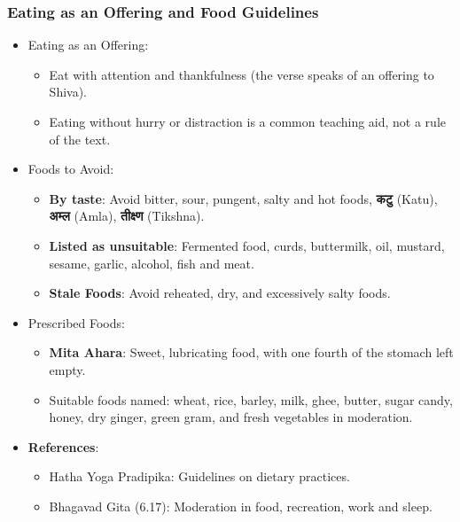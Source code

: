 \begin{frame}[fragile]\frametitle{Eating as an Offering and Food Guidelines}

\begin{itemize}
    \item Eating as an Offering: 
        \begin{itemize}
            \item Eat with attention and thankfulness (the verse speaks of an offering to Shiva).
            \item Eating without hurry or distraction is a common teaching aid, not a rule of the text.
        \end{itemize}
    \item Foods to Avoid:
        \begin{itemize}
            \item \textbf{By taste}: Avoid bitter, sour, pungent, salty and hot foods, \textbf{कटु} (Katu), \textbf{अम्ल} (Amla), \textbf{तीक्ष्ण} (Tikshna).
            \item \textbf{Listed as unsuitable}: Fermented food, curds, buttermilk, oil, mustard, sesame, garlic, alcohol, fish and meat.
            \item \textbf{Stale Foods}: Avoid reheated, dry, and excessively salty foods.
        \end{itemize}
    \item Prescribed Foods:
        \begin{itemize}
            \item \textbf{Mita Ahara}: Sweet, lubricating food, with one fourth of the stomach left empty.
            \item Suitable foods named: wheat, rice, barley, milk, ghee, butter, sugar candy, honey, dry ginger, green gram, and fresh vegetables in moderation.
        \end{itemize}
\end{itemize}
\begin{itemize}
    \item \textbf{References}:
        \begin{itemize}
            \item Hatha Yoga Pradipika: Guidelines on dietary practices.
            \item Bhagavad Gita (6.17): Moderation in food, recreation, work and sleep.
        \end{itemize}
\end{itemize}

\end{frame}

